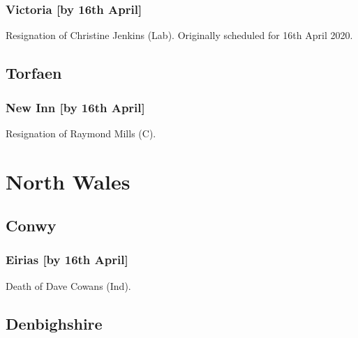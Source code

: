 \documentclass[a4paper,openany]{book}
\begin{document}
\begin{resultsiii}
\subsubsection*{Victoria \hspace*{\fill}\nolinebreak[1]%
	\enspace\hspace*{\fill}
	[by 16th April]}


Resignation of Christine Jenkins (Lab).  Originally scheduled for 16th April 2020.

\subsection*{Torfaen}

\subsubsection*{New Inn \hspace*{\fill}\nolinebreak[1]%
	\enspace\hspace*{\fill}
	[by 16th April]}


Resignation of Raymond Mills (C).

\section{North Wales}

\subsection*{Conwy}

\subsubsection*{Eirias \hspace*{\fill}\nolinebreak[1]%
	\enspace\hspace*{\fill}
	[by 16th April]}


Death of Dave Cowans (Ind).

\subsection*{Denbighshire}


\end{resultsiii}
\end{document}
